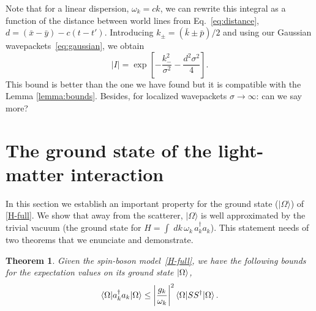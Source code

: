 \documentclass[notitlepage, prx, preprint, amsmath,superscriptaddress,amssymb]{revtex4-1}
\newtheorem{theorem}{Theorem}[section]
\begin{document}
Note that for a linear dispersion, $\omega_k=c k$, we can rewrite this integral as a function of the distance between world lines from Eq.\ \eqref{eq:distance}, $d=(\bar x-\bar y)-c(t-t')$.
Introducing $k_{\pm}=(\bar k \pm \bar p)/2$ and using our Gaussian wavepackets\ \eqref{eq:gaussian}, we obtain
\begin{equation}
|I| = \exp\left[-\frac{k_-^2}{\sigma^2}-\frac{d^2\sigma^2}{4}\right].
\label{eq:free-commutator}
\end{equation}
This bound is better than the one we have found but it is compatible with the Lemma \ref{lemma:bounds}.
{\color{red} Besides, for localized wavepackets $\sigma \to \infty$: can we say more?}



\section{The ground state of the light-matter interaction}


In this section we establish an important property for the ground state ($|\Omega\rangle$)   of \eqref{H-full}.  We show that  away from the scatterer,  $|\Omega\rangle$ is well approximated by the trivial vacuum  (the ground state for $H= \int \; dk \, \omega_k \, a_k^\dagger a_k$).  This statement needs of two theorems that we enunciate and demonstrate.


\begin{theorem}
\label{th:bound-a}
Given the spin-boson model\ \eqref{H-full}, we have the following bounds for the expectation values on its ground state $\ket{\Omega}$,
\begin{equation}
\label{bound-nk}
\braket{\Omega|a_k^{\dagger}a_k|\Omega} \leq \left|\frac{g_k}{\omega_k}\right|^{2}
\braket{\Omega|S S^\dagger |\Omega} .
\end{equation}
\end{theorem}
\end{document}
